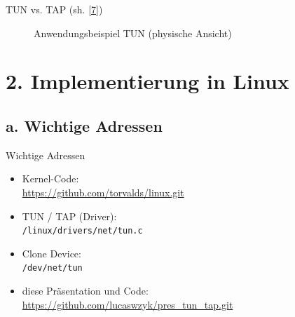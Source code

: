\documentclass[ngerman,aspectratio=169]{beamer}
\begin{document}
\begin{frame}{TUN vs. TAP (sh. \hyperlink{ref:openvpn}{[7]})}
{\begin{figure}
				\caption{Anwendungsbeispiel TUN (physische Ansicht)}
			\end{figure}
		}
	\end{frame}

	\section{2. Implementierung in Linux}
	\subsection{a. Wichtige Adressen}
	\begin{frame}{Wichtige Adressen}
		\begin{itemize}
			\setlength\itemsep{.3cm}
			\item Kernel-Code:\\
			\url{https://github.com/torvalds/linux.git}
			
			\item TUN / TAP (Driver):\\
			\texttt{/linux/drivers/net/tun.c}
			
			\item Clone Device:\\
			\texttt{/dev/net/tun}
			
			\item diese Präsentation und Code:\\
			\url{https://github.com/lucaswzyk/pres_tun_tap.git}
		\end{itemize}
	\end{frame}
	
\end{document}
